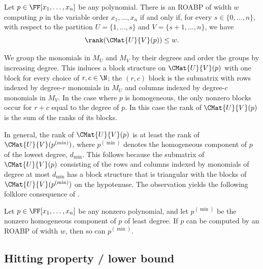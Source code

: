 \documentclass{toc}
\begin{document}
\begin{lemma}
  \label{lem.roabp-char}
  Let \(p\in\FF[x_1,\ldots,x_n]\) be any polynomial.
  There is an ROABP of width \(w\) computing \(p\) in the variable order
  \(x_1,\ldots,x_n\) if and only if,
  for every \(s \in \{0,\ldots,n\}\),
  with respect to the partition
  \(U = \{1,\ldots,s\}\) and \(V = \{{s+1},\ldots,n\}\),
  we have
  \[
    \rank( \CMat{U}{V}(p) ) \le w.
  \]
\end{lemma}

We group the monomials in $M_U$ and $M_V$ by their degrees
and order the groups by increasing degree.
This induces a block structure on $\CMat{U}{V}(p)$ with one block for every
choice of $r, c \in \N$;
the \((r,c)\) block is the submatrix with rows indexed by degree-\(r\)
monomials in \(M_U\) and columns indexed by degree-\(c\) monomials in \(M_V\).
In the case where $p$ is homogeneous,
the only nonzero blocks occur for $r+c$ equal to the degree of $p$.
In this case the rank of \(\CMat{U}{V}(p)\) is the sum of the ranks of its
blocks.

In general,
the rank of $\CMat{U}{V}(p)$ is at least the rank of
$\CMat{U}{V}(p^{(\min)})$,
where $p^{(\min)}$ denotes the homogeneous component of $p$ of the lowest degree,
$d_{\min}$.
This follows because the submatrix of $\CMat{U}{V}(p)$ consisting of the rows
and columns indexed by monomials of degree at most $d_{\min}$ has a block
structure that is triangular with the blocks of $\CMat{U}{V}(p^{(\min)})$ on
the hypotenuse.
The observation yields the following folklore consequence of
.
\begin{proposition}
  \label{prop.roabp-homog}
  \def\pdn{p^{(\min)}}
  Let \(p\in\FF[x_1,\ldots,x_n]\) be any nonzero polynomial,
  and let \(\pdn\) be the nonzero homogeneous component of \(p\) of least degree.
  If \(p\) can be computed by an ROABP of width \(w\),
  then so can \(\pdn\).
\end{proposition}

\subsection{Hitting property / lower bound}
\label{s.roabp.hitting-lower}
\end{document}
